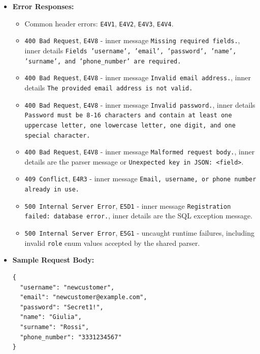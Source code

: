 \begin{itemize}[nosep]
Content:

\begin{lstlisting}
{
  "id": 6
}
\end{lstlisting}

\item \textbf{Error Responses:}

\begin{itemize}[nosep]
\item Common header errors: \texttt{E4V1}, \texttt{E4V2}, \texttt{E4V3}, \texttt{E4V4}.
\item \texttt{400 Bad Request}, \texttt{E4V8} - inner message \texttt{Missing required fields.}, inner details \texttt{Fields 'username', 'email', 'password', 'name', 'surname', and 'phone\_number' are required.}
\item \texttt{400 Bad Request}, \texttt{E4V8} - inner message \texttt{Invalid email address.}, inner details \texttt{The provided email address is not valid.}
\item \texttt{400 Bad Request}, \texttt{E4V8} - inner message \texttt{Invalid password.}, inner details \texttt{Password must be 8-16 characters and contain at least one uppercase letter, one lowercase letter, one digit, and one special character.}
\item \texttt{400 Bad Request}, \texttt{E4V8} - inner message \texttt{Malformed request body.}, inner details are the parser message or \texttt{Unexpected key in JSON: <field>}.
\item \texttt{409 Conflict}, \texttt{E4R3} - inner message \texttt{Email, username, or phone number already in use.}
\item \texttt{500 Internal Server Error}, \texttt{E5D1} - inner message \texttt{Registration failed: database error.}, inner details are the SQL exception message.
\item \texttt{500 Internal Server Error}, \texttt{E5G1} - uncaught runtime failures, including invalid \texttt{role} enum values accepted by the shared parser.
\end{itemize}

\item \textbf{Sample Request Body:}

\begin{lstlisting}
{
  "username": "newcustomer",
  "email": "newcustomer@example.com",
  "password": "Secret1!",
  "name": "Giulia",
  "surname": "Rossi",
  "phone_number": "3331234567"
}
\end{lstlisting}
\end{itemize}

